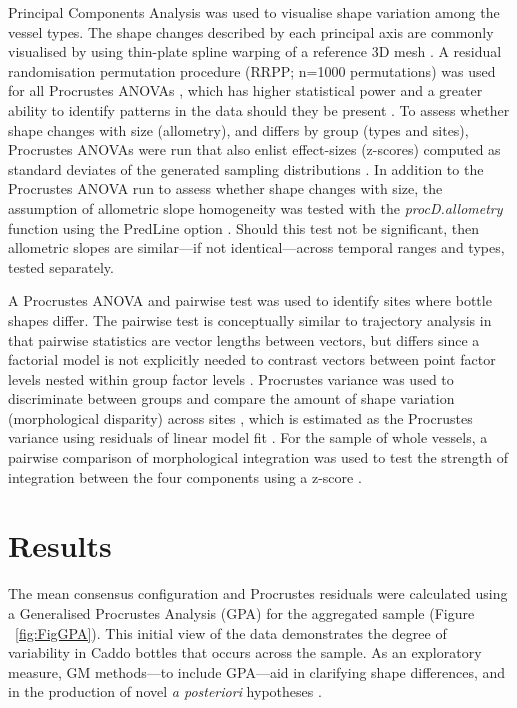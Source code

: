 \documentclass[review]{elsarticle}
\begin{document}
Principal Components Analysis \citep{RN1746} was used to visualise shape variation among the vessel types. The shape changes described by each principal axis are commonly visualised by using thin-plate spline warping of a reference 3D mesh \citep{RN1731,RN479}. A residual randomisation permutation procedure (RRPP; n=1000 permutations) was used for all Procrustes ANOVAs \citep{RN1655,RN11775}, which has higher statistical power and a greater ability to identify patterns in the data should they be present \citep{RN1719}. To assess whether shape changes with size (allometry), and differs by group (types and sites), Procrustes ANOVAs \citep{RN1749} were run that also enlist effect-sizes (z-scores) computed as standard deviates of the generated sampling distributions \citep{RN1756}. In addition to the Procrustes ANOVA run to assess whether shape changes with size, the assumption of allometric slope homogeneity was tested with the \textit{procD.allometry} function using the PredLine option \citep{RN1649}. Should this test not be significant, then allometric slopes are similar---if not identical---across temporal ranges and types, tested separately.

A Procrustes ANOVA and pairwise test was used to identify sites where bottle shapes differ. The pairwise test is conceptually similar to trajectory analysis \citep{RN11573,RN1648,RN1776,RN1739} in that pairwise statistics are vector lengths between vectors, but differs since a factorial model is not explicitly needed to contrast vectors between point factor levels nested within group factor levels \citep{RN11530}. Procrustes variance was used to discriminate between groups and compare the amount of shape variation (morphological disparity) across sites \citep{RN11560}, which  is estimated as the Procrustes variance using residuals of linear model fit \citep{RN11530}. For the sample of whole vessels, a pairwise comparison of morphological integration was used to test the strength of integration between the four components using a z-score \citep{RN11700}.

\section{Results}

The mean consensus configuration and Procrustes residuals were calculated using a Generalised Procrustes Analysis (GPA) for the aggregated sample \citep[Figure 3]{RN1720} (Figure ~\ref{fig:FigGPA}). This initial view of the data demonstrates the degree of variability in Caddo bottles that occurs across the sample. As an exploratory measure, GM methods---to include GPA---aid in clarifying shape differences, and in the production of novel \textit{a posteriori} hypotheses \citep{RN1720}.
\end{document}
